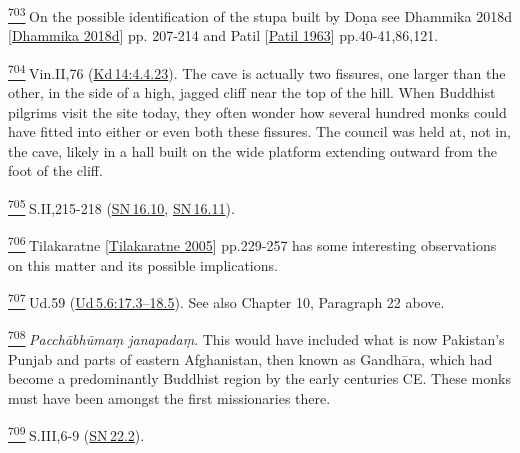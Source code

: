 \label{footprints_split_025.html_fn703}
\hyperref[footprints_split_018.htmlux5cux23fnref703]{\textsuperscript{703}} On
the possible identification of the stupa built by Doṇa see {Dhammika
2018d
{{[}\hyperref[footprints_split_022.htmlux5cux23Dhammikaux5cux25202018d]{Dhammika
2018d}{]}}} pp. 207-214 and {Patil
{{[}\hyperref[footprints_split_022.htmlux5cux23Patilux5cux25201963]{Patil
1963}{]}}} pp.40-41,86,121.

\label{footprints_split_025.html_fn704}
\hyperref[footprints_split_018.htmlux5cux23fnref704]{\textsuperscript{704}} Vin.II,76
(\href{https://suttacentral.net/pli-tv-kd14/en/brahmali\#4.4.23}{Kd\,14:4.4.23}).
The cave is actually two fissures, one larger than the other, in the
side of a high, jagged cliff near the top of the hill. When Buddhist
pilgrims visit the site today, they often wonder how several hundred
monks could have fitted into either or even both these fissures. The
council was held at, not in, the cave, likely in a hall built on the
wide platform extending outward from the foot of the cliff.

\label{footprints_split_025.html_fn705}
\hyperref[footprints_split_018.htmlux5cux23fnref705]{\textsuperscript{705}} S.II,215-218
(\href{https://suttacentral.net/sn16.10/en/sujato}{SN\,16.10},
\href{https://suttacentral.net/sn16.11/en/sujato}{SN\,16.11}).

\label{footprints_split_025.html_fn706}
\hyperref[footprints_split_018.htmlux5cux23fnref706]{\textsuperscript{706}} {Tilakaratne
{{[}\hyperref[footprints_split_022.htmlux5cux23Tilakaratneux5cux25202005]{Tilakaratne
2005}{]}}} pp.229-257 has some interesting observations on this matter
and its possible implications.

\label{footprints_split_025.html_fn707}
\hyperref[footprints_split_018.htmlux5cux23fnref707]{\textsuperscript{707}} Ud.59
(\href{https://suttacentral.net/ud5.6/en/sujato\#17.3}{Ud\,5.6:17.3--18.5}).
See also {Chapter 10, Paragraph 22} above.

\label{footprints_split_025.html_fn708}
\hyperref[footprints_split_018.htmlux5cux23fnref708]{\textsuperscript{708}} \emph{Pacchābhūmaṃ
janapadaṃ}. This would have included what is now Pakistan's Punjab and
parts of eastern Afghanistan, then known as Gandhāra, which had become a
predominantly Buddhist region by the early centuries CE. These monks
must have been amongst the first missionaries there.

\label{footprints_split_025.html_fn709}
\hyperref[footprints_split_018.htmlux5cux23fnref709]{\textsuperscript{709}} S.III,6-9
(\href{https://suttacentral.net/sn22.2/en/sujato}{SN\,22.2}).


